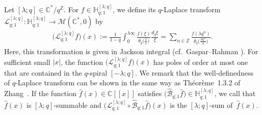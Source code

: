 Let $[\lambda;q]\in\mathbb{C}^*/q^{\mathbb{Z}}$. For $f\in\mathbb{H}_{q;1}^{[\lambda;q]}$, we define its $q$-Laplace transform $\mathcal{L}_{q;1}^{[\lambda;q]}\colon \mathbb{H}_{q;1}^{[\lambda;q]}\to\mathcal{M}(\mathbb{C}^*,0)$ by
\begin{gather*}
\big(\mathcal{L}_{q;1}^{[\lambda;q]}f\big)(x):=\frac{1}{1-q}\int_{0}^{\lambda\infty}\frac{f(\xi)}{\theta_q\big(\frac{\xi}{x}\big)}\frac{d_q\xi}{\xi}=\sum_{n\in\mathbb{Z}}\frac{f(\lambda q^n)}{\theta_q\big(\frac{\lambda q^n}{x}\big)}.
\end{gather*}
Here, this transformation is given in Jackson integral (cf.\ Gaspar--Rahman \cite[Section~1.10]{Gasper&Rahman2004}). For sufficient small $|x|$, the function $\big(\mathcal{L}_{q;1}^{[\lambda;q]}f\big)(x)$ has poles of order at most one that are contained in the $q$-spiral $[-\lambda;q]$. We remark that the well-definedness of $q$-Laplace transform can be shown in the same way as Th\'eor\`eme~1.3.2 of Zhang~\cite{Zhang2002}. If the function $\hat{f}(x)\in\mathbb{C}[[x]]$ satisfies $\big(\hat{\mathcal{B}}_{q;1}\hat{f}\big)\in\mathbb{H}_{q;1}^{[\lambda;q]}$, we call that $\hat{f}(x)$ is $[\lambda;q]$-summable and $\big(\mathcal{L}_{q;1}^{[\lambda;q]}\circ\hat{\mathcal{B}}_{q;1}\hat{f}\big)(x)$ is the $[\lambda;q]$-sum of~$\hat{f}(x)$.


